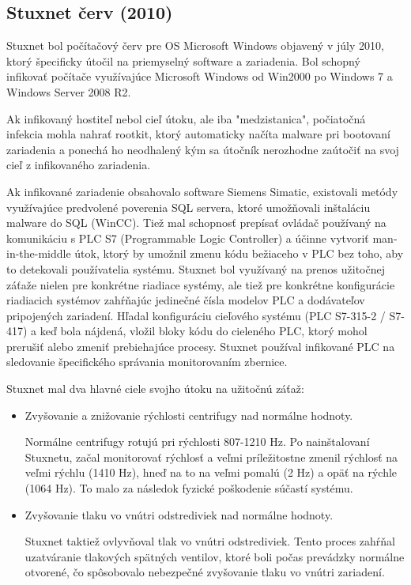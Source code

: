 \subsection{Stuxnet červ (2010)}
\tab Stuxnet bol počítačový červ pre OS Microsoft Windows objavený v júly 2010, ktorý špecificky útočil na priemyselný software a zariadenia\cite[p.~3-20]{nist}. Bol schopný infikovať počítače využívajúce Microsoft Windows od Win2000 po Windows 7 a Windows Server 2008 R2. \par
Ak infikovaný hostiteľ nebol cieľ útoku, ale iba "medzistanica", počiatočná infekcia mohla nahrať rootkit, ktorý automaticky načíta malware pri bootovaní zariadenia a ponechá ho neodhalený kým sa útočník nerozhodne zaútočiť na svoj cieľ z infikovaného zariadenia. \par
Ak infikované zariadenie obsahovalo software Siemens Simatic, existovali metódy využívajúce predvolené poverenia SQL servera, ktoré umožňovali inštaláciu malware do SQL (WinCC). Tiež mal schopnosť prepísať ovládač používaný na komunikáciu s PLC S7 (Programmable Logic Controller) a účinne vytvoriť man-in-the-middle útok, ktorý by umožnil zmenu kódu bežiaceho v PLC bez toho, aby to detekovali používatelia systému.
Stuxnet bol využívaný na prenos užitočnej záťaže nielen pre konkrétne riadiace systémy, ale tiež pre konkrétne konfigurácie riadiacich systémov zahŕňajúc jedinečné čísla modelov PLC a dodávateľov pripojených zariadení. Hľadal konfiguráciu cieľového systému (PLC S7-315-2 / S7-417) a keď bola nájdená, vložil bloky kódu do cieleného PLC, ktorý mohol prerušiť alebo zmeniť prebiehajúce procesy. Stuxnet používal infikované PLC na sledovanie špecifického správania monitorovaním zbernice. \par
Stuxnet mal dva hlavné ciele svojho útoku na užitočnú záťaž:
\begin{itemize}
\item Zvyšovanie a znižovanie rýchlosti centrifugy nad normálne hodnoty. \par
Normálne centrifugy rotujú pri rýchlosti 807-1210 Hz. Po nainštalovaní Stuxnetu, začal monitorovať rýchlosť a veľmi príležitostne zmenil rýchlosť na veľmi rýchlu (1410 Hz), hneď na to na veľmi pomalú (2 Hz) a opäť na rýchle (1064 Hz). To malo za následok fyzické poškodenie súčastí systému.
\item Zvyšovanie tlaku vo vnútri odstrediviek nad normálne hodnoty. \par
Stuxnet taktiež ovlyvňoval tlak vo vnútri odstrediviek. Tento proces zahŕňal uzatváranie tlakových spätných ventilov, ktoré boli počas prevádzky normálne otvorené, čo spôsobovalo nebezpečné zvyšovanie tlaku vo vnútri zariadení\cite{Security}\cite{IoTSec}.
\end{itemize}

